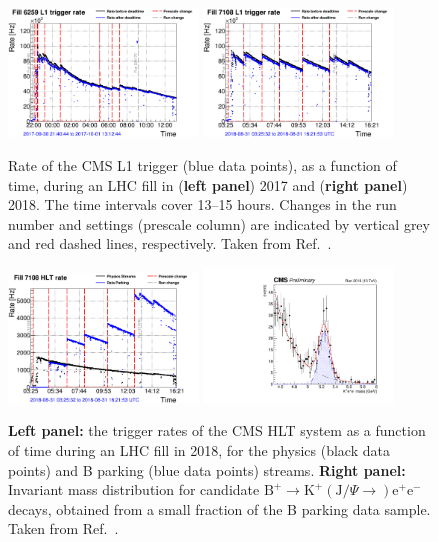 \documentclass{webofc}
\newcommand{\kjpsi}{\ensuremath{(\textrm{J}/\Psi{\rightarrow})}\xspace}
\newcommand{\ee}{\ensuremath{\textrm{e}^+\textrm{e}^-}\xspace}
\newcommand{\btok}{\ensuremath{\textrm{B}^+{\rightarrow}\textrm{K}^+}\xspace}
\newcommand{\btokjpsiee}{\ensuremath{\btok\kjpsi\ee}\xspace}
\begin{document}
\begin{figure}[!t]
  \centering
  \includegraphics[width=0.45\textwidth]{CMS-DP-2019-XXX_S02}
  \includegraphics[width=0.45\textwidth]{CMS-DP-2019-XXX_S03}
  \caption{Rate of the CMS L1 trigger (blue data points), as a
    function of time, during an LHC fill in (\textbf{left panel}) 2017
    and (\textbf{right panel}) 2018. The time intervals cover 13--15
    hours. Changes in the run number and settings (prescale column)
    are indicated by vertical grey and red dashed lines,
    respectively. Taken from Ref.~\cite{bpark-dps}.}  
  \label{fig:1}
\end{figure}

\begin{figure}[!t]
  \centering
  \includegraphics[width=0.45\textwidth]{CMS-DP-2019-XXX_S04}
  \includegraphics[width=0.45\textwidth,height=0.3\textwidth]{CMS-DP-2019-XXX_S11}
  \caption{\textbf{Left panel:} the trigger rates of the CMS HLT
    system as a function of time during an LHC fill in 2018, for the
    physics (black data points) and B parking (blue data points)
    streams.  \textbf{Right panel:} Invariant mass distribution for
    candidate \btokjpsiee decays, obtained from a small fraction of
    the B parking data sample. Taken from 
    Ref.~\cite{bpark-dps}.}
  \label{fig:2} \end{figure} 
\end{document}
